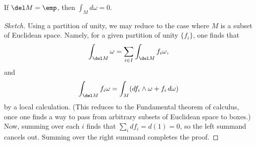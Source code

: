 \documentclass[../notes.tex]{subfiles}
\begin{document}
\begin{example}
	If $\del M=\emp$, then $\int_Md\omega=0$.
\end{example}
\begin{proof}[Sketch]
	Using a partition of unity, we may reduce to the case where $M$ is a subset of Euclidean space. Namely, for a given partition of unity $\{f_i\}$, one finds that
	\[\int_{\del M}\omega=\sum_{i\in I}\int_{\del M}f_i\omega,\]
	and
	\[\int_{\del M}f_i\omega=\int_M(df_i\land\omega+f_i\,d\omega)\]
	by a local calculation. (This reduces to the Fundamental theorem of calculus, once one finds a way to pass from arbitrary subsets of Euclidean space to boxes.) Now, summing over each $i$ finds that $\sum_idf_i=d(1)=0$, so the left summand cancels out. Summing over the right summand completes the proof.
\end{proof}
\end{document}
